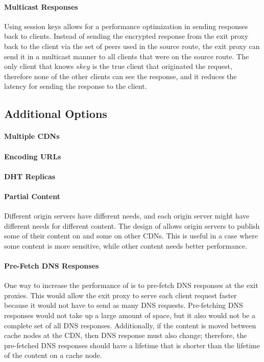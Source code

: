 \paragraph{Multicast Responses}
Using session keys allows for a performance optimization in sending responses back to clients.  Instead of sending 
the encrypted response from the exit proxy back to the client via the set of peers used in the source route, the exit 
proxy can send it in a multicast manner to all clients that were on the source route.  The only client that knows $skey$ 
is the true client that originated the request, therefore none of the other clients can see the response, and it reduces the 
latency for sending the response to the client.  

\subsection{Additional Options}

\paragraph{Multiple CDNs}

\paragraph{Encoding URLs}

\paragraph{DHT Replicas}

\paragraph{Partial Content}
Different origin servers have different needs, and each origin server might 
have different needs for different content.  The design of \system{} allows origin servers
 to publish some of their content on \system{} and some on other CDNs.  
This is useful in a case where some content is more sensitive, while other content needs 
better performance.

\paragraph{Pre-Fetch DNS Responses} 
One way to increase the performance of \system{} is to pre-fetch DNS responses at 
the exit proxies.  This would allow the exit proxy to serve each client request faster 
because it would not have to send as many DNS requests.  Pre-fetching DNS responses would 
not take up a large amount of space, but it also would not be a complete set of all DNS 
responses.  Additionally, if the content is moved between cache nodes at the CDN, then DNS 
response must also change; therefore, the pre-fetched DNS responses should have a lifetime 
that is shorter than the lifetime of the content on a cache node.


